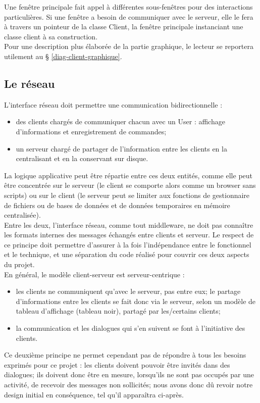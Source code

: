 \documentclass[a4paper,titlepage]{scrreprt}
\begin{document}
         Une fenêtre principale fait appel à différentes sous-fenêtres pour des interactions particulières.
         Si une fenêtre a besoin de communiquer avec le serveur, elle le fera à travers un pointeur de la classe Client,
         la fenêtre principale instanciant une classe client à sa construction.\\
         
    Pour une description plus élaborée de la partie graphique, le lecteur se reportera utilement au § \ref{diag-client-graphique}.
    
\subsection{Le réseau}
  L'interface réseau doit permettre une communication bidirectionnelle :
\begin{itemize}
  \item des clients chargés de communiquer chacun avec un User : affichage d'informations et enregistrement de commandes;
  \item un serveur chargé de partager de l'information entre les clients en la centralisant et en la conservant sur disque.
\end{itemize}
La logique applicative peut être répartie entre ces deux entités, comme elle peut être concentrée sur le serveur (le client se comporte alors comme un browser sans scripts) ou sur le client (le serveur peut se limiter aux fonctions de gestionnaire de fichiers ou de bases de données et de données temporaires en mémoire centralisée).\\
Entre les deux, l'interface réseau, comme tout middleware, ne doit pas connaître les formats internes des messages échangés entre clients et serveur. Le respect de ce principe doit permettre d'assurer à la fois l'indépendance entre le fonctionnel et le technique, et une séparation du code réalisé pour couvrir ces deux aspects du projet.\\
En général, le modèle client-serveur \cite{Bulfone} est serveur-centrique :
\begin{itemize}
  \item les clients ne communiquent qu'avec le serveur, pas entre eux; le partage d'informations entre les clients
  se fait donc via le serveur, selon un modèle de tableau d'affichage (tableau noir), partagé par les/certains clients;
  \item la communication et les dialogues qui s'en suivent se font à l'initiative des clients.
\end{itemize}
Ce deuxième principe ne permet cependant pas de répondre à tous les besoins exprimés pour ce projet :
les clients doivent pouvoir être invités dans des dialogues; ils doivent donc être en mesure,
lorsqu'ils ne sont pas occupés par une activité, de recevoir des messages non sollicités;
nous avons donc dû revoir notre design initial en conséquence, tel qu'il apparaîtra ci-après.\\
\end{document}
